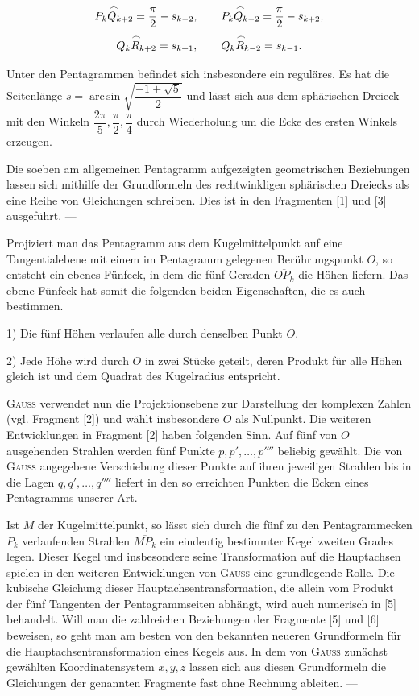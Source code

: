 \[
\overset{\frown}{P_kQ_{k+2}} = \frac{\pi}{2} - s_{k-2}, \qquad \overset{\frown}{P_kQ_{k-2}} = \frac{\pi}{2} - s_{k+2},
\]
\[
\overset{\frown}{Q_kR_{k+2}} = s_{k+1}, \qquad \overset{\frown}{Q_kR_{k-2}} = s_{k-1}.
\]

Unter den Pentagrammen befindet sich insbesondere ein reguläres. Es hat die Seitenlänge
$s = \operatorname{arc\,sin}\sqrt{\dfrac{-1+\sqrt{5}}{2}}$ und lässt sich aus dem sphärischen Dreieck mit den
Winkeln $\dfrac{2\pi}{5}, \dfrac{\pi}{2}, \dfrac{\pi}{4}$ durch Wiederholung um die Ecke des
ersten Winkels erzeugen.

Die soeben am allgemeinen Pentagramm aufgezeigten geometrischen Beziehungen lassen sich
mithilfe der Grundformeln des rechtwinkligen sphärischen Dreiecks als eine Reihe von
Gleichungen schreiben. Dies ist in den Fragmenten [1] und [3] ausgeführt. ---

Projiziert man das Pentagramm aus dem Kugelmittelpunkt auf eine Tangentialebene mit einem im
Pentagramm gelegenen Berührungspunkt $O$, so entsteht ein ebenes Fünfeck, in dem die fünf
Geraden $\overline{OP_k}$ die Höhen liefern. Das ebene Fünfeck hat somit die folgenden beiden
Eigenschaften, die es auch bestimmen.

1) Die fünf Höhen verlaufen alle durch denselben Punkt $O$.

2) Jede Höhe wird durch $O$ in zwei Stücke geteilt, deren Produkt für alle Höhen
gleich ist und dem Quadrat des Kugelradius entspricht.

\textsc{Gauss} verwendet nun die Projektionsebene zur Darstellung der komplexen Zahlen (vgl. Fragment [2])
und wählt insbesondere $O$ als Nullpunkt. Die weiteren Entwicklungen in Fragment [2]
haben folgenden Sinn. Auf fünf von $O$ ausgehenden Strahlen werden fünf
Punkte $p, p', \ldots, p''''$ beliebig gewählt. Die von \textsc{Gauss} angegebene Verschiebung
dieser Punkte auf ihren jeweiligen Strahlen bis in die Lagen $q, q', \ldots, q''''$ liefert
in den so erreichten Punkten die Ecken eines Pentagramms unserer Art. ---

Ist $M$ der Kugelmittelpunkt, so lässt sich durch die fünf zu den Pentagrammecken $P_k$
verlaufenden Strahlen $\overline{MP_k}$ ein eindeutig bestimmter Kegel zweiten Grades legen.
Dieser Kegel und insbesondere seine Transformation auf die Hauptachsen spielen in den weiteren Entwicklungen von \textsc{Gauss}
eine grundlegende Rolle. Die kubische Gleichung dieser Hauptachsentransformation, die
allein vom Produkt der fünf Tangenten der Pentagrammseiten abhängt, wird auch
numerisch in [5] behandelt. Will man die zahlreichen Beziehungen der
Fragmente [5] und [6] beweisen, so geht man am besten von den bekannten neueren
Grundformeln für die Hauptachsentransformation eines Kegels aus. In dem von \textsc{Gauss} zunächst
gewählten Koordinatensystem $x, y, z$ lassen sich aus diesen Grundformeln die Gleichungen
der genannten Fragmente fast ohne Rechnung ableiten. ---


